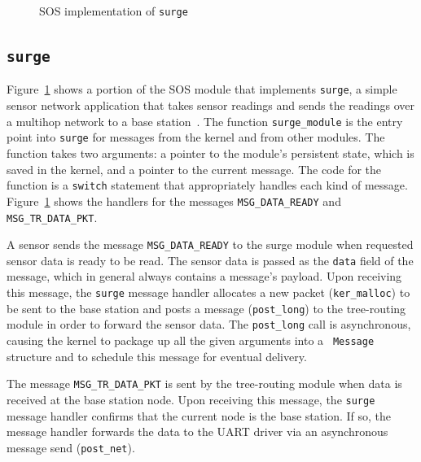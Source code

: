 \begin{figure}[t]

\caption{SOS implementation of {\tt surge}\label{fig:surge}}
\end{figure}

\subsection{{\tt surge}}

Figure~\ref{fig:surge} shows a portion of the 
SOS module that implements {\tt surge},
a simple sensor network application
that takes sensor readings and sends the readings over a multihop network
to a base station~\cite{nesC}. 
The function
{\tt surge\_module} is the entry point into {\tt surge}
for messages from the kernel and from other
modules. 
The function takes two arguments: a pointer to
the module's persistent state, which
is saved in the kernel, and a pointer to the current message.
The code for the function is a {\tt switch}
statement that appropriately handles each kind of message. 
Figure~\ref{fig:surge} shows the handlers for the messages
{\tt MSG\_DATA\_READY} and {\tt MSG\_TR\_DATA\_PKT}.

A sensor sends the message {\tt MSG\_DATA\_READY} to the surge module
when requested sensor data is ready to be read. The sensor data
is passed as the {\tt data} field of the message, which in general
always contains a message's payload.  Upon receiving this message,
the {\tt surge} message handler
allocates a new packet ({\tt ker\_malloc})
to be sent to the base station and posts a message ({\tt post\_long})
to the tree-routing module in order to forward the sensor data.  The
{\tt post\_long} call is asynchronous, causing the kernel to 
package up all the given arguments into a {\tt
  Message} structure and to schedule this message for eventual delivery.

The message {\tt MSG\_TR\_DATA\_PKT} is sent by the tree-routing module
when data is received at the base station node.
Upon receiving this message, the {\tt surge} message handler 
confirms that 
the current node is the base station.  If so, 
the message handler 
forwards the data to the UART driver via an
asynchronous message send ({\tt post\_net}).


